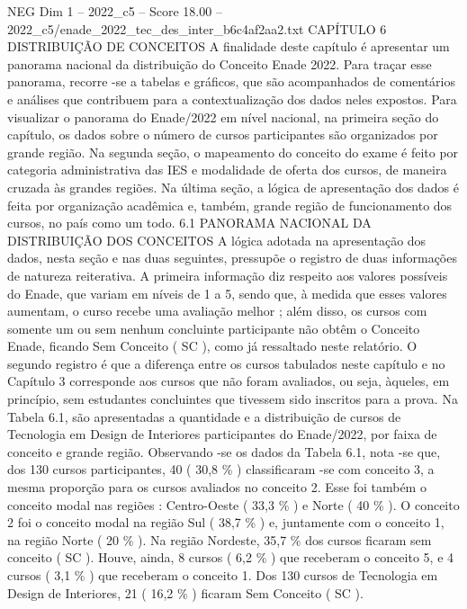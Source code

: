 \begin{textsample}{NEG Dim 1 – 2022\_c5 – Score 18.00 – 2022\_c5/enade\_2022\_tec\_des\_inter\_b6c4af2aa2.txt}  \label{ex:f1_neg_420}
CAPÍTULO 6 DISTRIBUIÇÃO DE CONCEITOS A finalidade deste capítulo é apresentar um panorama nacional da distribuição do Conceito Enade 2022.
Para traçar esse panorama, recorre -se a tabelas e gráficos, que são acompanhados de comentários e análises que contribuem para a contextualização dos dados neles expostos.
Para visualizar o panorama do Enade/2022 em nível nacional, na primeira seção do capítulo, os dados sobre o número de cursos participantes são organizados por grande região.
Na segunda seção, o mapeamento do conceito do exame é feito por categoria administrativa das IES e modalidade de oferta dos cursos, de maneira cruzada às grandes regiões.
Na última seção, a lógica de apresentação dos dados é feita por organização acadêmica e, também, grande região de funcionamento dos cursos, no país como um todo. 6.1 PANORAMA NACIONAL DA DISTRIBUIÇÃO DOS CONCEITOS A lógica adotada na apresentação dos dados, nesta seção e nas duas seguintes, pressupõe o registro de duas informações de natureza reiterativa.
A primeira informação diz respeito aos valores possíveis do Enade, que variam em níveis de 1 a 5, sendo que, à medida que esses valores aumentam, o curso recebe uma avaliação melhor ; além disso, os cursos com somente um ou sem nenhum concluinte participante não obtêm o Conceito Enade, ficando Sem Conceito ( SC ), como já ressaltado neste relatório.
O segundo registro é que a diferença entre os cursos tabulados neste capítulo e no Capítulo 3 corresponde aos cursos que não foram avaliados, ou seja, àqueles, em princípio, sem estudantes concluintes que tivessem sido inscritos para a prova.
Na Tabela 6.1, são apresentadas a quantidade e a distribuição de cursos de Tecnologia em Design de Interiores participantes do Enade/2022, por faixa de conceito e grande região.
Observando -se os dados da Tabela 6.1, nota -se que, dos 130 cursos participantes, 40 ( 30,8 \% ) classificaram -se com conceito 3, a mesma proporção para os cursos avaliados no conceito 2.
Esse foi também o conceito modal nas regiões : Centro-Oeste ( 33,3 \% ) e Norte ( 40 \% ).
O conceito 2 foi o conceito modal na região Sul ( 38,7 \% ) e, juntamente com o conceito 1, na região Norte ( 20 \% ).
Na região Nordeste, 35,7 \% dos cursos ficaram sem conceito ( SC ).
Houve, ainda, 8 cursos ( 6,2 \% ) que receberam o conceito 5, e 4 cursos ( 3,1 \% ) que receberam o conceito 1.
Dos 130 cursos de Tecnologia em Design de Interiores, 21 ( 16,2 \% ) ficaram Sem Conceito ( SC ).

\end{textsample}
